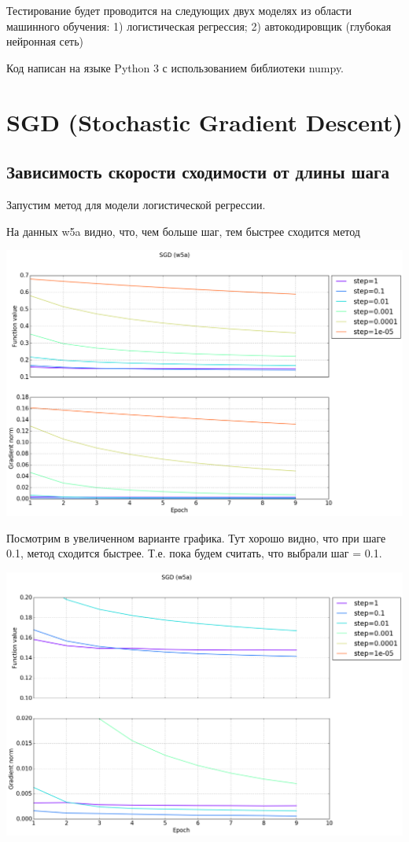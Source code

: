 \documentclass[12pt, a4paper]{article}
\begin{document}
    Тестирование будет проводится на следующих двух моделях из области машинного обучения: 1) логистическая регрессия; 2) автокодировщик (глубокая нейронная сеть)

    Код написан на языке Python 3 с использованием библиотеки numpy.

    \section{SGD (Stochastic Gradient Descent)}
    \subsection{Зависимость скорости сходимости от длины шага}
    Запустим метод для модели логистической регрессии.

    На данных w5a видно, что, чем больше шаг, тем быстрее сходится метод

    \def \picwidth {17cm}
    \begin{center}\includegraphics[width=\picwidth]{sgd_w5a.png}\end{center}

    Посмотрим в увеличенном варианте графика. Тут хорошо видно, что при шаге 0.1, метод сходится быстрее. Т.е. пока будем считать, что выбрали шаг = 0.1.

    \begin{center}\includegraphics[width=\picwidth]{sgd_w5a_zoomed.png}\end{center}
\end{document}

